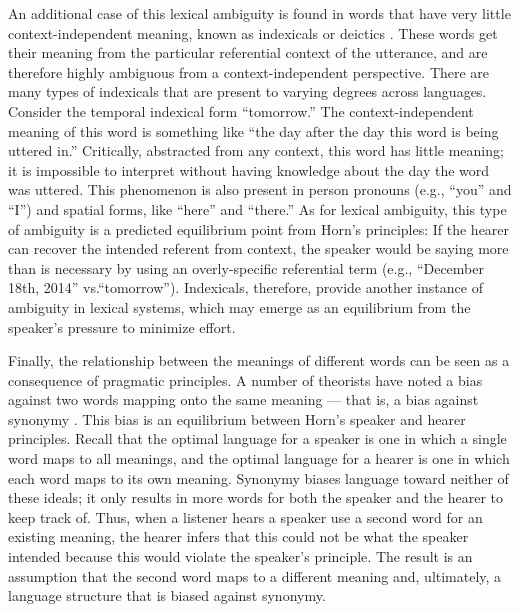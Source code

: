 \documentclass[man]{apa2}
\begin{document}
An additional case of this lexical ambiguity is found in words that have very little context-independent meaning, known as indexicals or deictics \cite{frawley2003international}. These words get their meaning from the particular referential context of the utterance, and are therefore highly ambiguous from a context-independent perspective. There are many types of indexicals that are present to varying degrees across languages. Consider the temporal indexical form ``tomorrow.'' The context-independent meaning of this word is something like ``the day after the day this word is being uttered in.'' Critically, abstracted from any context, this word has little meaning; it is impossible to interpret without having knowledge about the day the word was uttered. This phenomenon is also present in person pronouns (e.g., ``you'' and ``I'') and spatial forms, like ``here'' and ``there.'' As for lexical ambiguity, this type of ambiguity is a predicted equilibrium point from Horn's principles: If the hearer can recover the intended referent from context, the speaker would be saying more than is necessary by using an overly-specific referential term (e.g., ``December 18th, 2014'' vs.``tomorrow''). Indexicals, therefore, provide another instance of ambiguity in lexical systems, which may emerge as an equilibrium from the speaker's pressure to minimize effort. 

Finally, the relationship between the meanings of different words can be seen as a consequence of pragmatic principles. A number of theorists have noted a bias against two words mapping onto the same meaning --- that is, a bias against synonymy \cite{saussure, kiparsky1983word, horn1984, clark1987principle, clark1988logic}. This bias is an equilibrium between Horn's speaker and hearer principles. Recall that the optimal language for a speaker is one in which a single word maps to all meanings, and the optimal language for a hearer is one in which each word maps to its own meaning. Synonymy biases language toward neither of these ideals; it only results in more words for both the speaker and the hearer to keep track of.  Thus, when a listener hears a speaker use a second word for an existing meaning, the hearer infers that this could not be what the speaker intended because this would violate the speaker's principle. The result is  an assumption that the second word maps to a different meaning and, ultimately, a language structure that is biased against synonymy.
\end{document}
